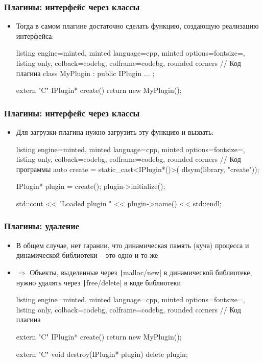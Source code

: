 \documentclass[10pt]{beamer}
\begin{document}
\begin{frame}[fragile]
\frametitle{Плагины: интерфейс через классы}
\begin{itemize}
\item Тогда в самом плагине достаточно сделать функцию, создающую реализацию интерфейса:
\begin{tcblisting}{listing engine=minted, minted language=cpp, minted options={fontsize=\scriptsize}, listing only, colback=codebg, colframe=codebg, rounded corners}
// Код плагина
class MyPlugin : public IPlugin { ... };

extern "C" IPlugin* create() {
  return new MyPlugin();
}
\end{tcblisting}
\end{itemize}
\end{frame}

\begin{frame}[fragile]
\frametitle{Плагины: интерфейс через классы}
\begin{itemize}
\item Для загрузки плагина нужно загрузить эту функцию и вызвать:
\begin{tcblisting}{listing engine=minted, minted language=cpp, minted options={fontsize=\scriptsize}, listing only, colback=codebg, colframe=codebg, rounded corners}
// Код программы
auto create = static_cast<IPlugin*()>(
  dlsym(library, "create"));

IPlugin* plugin = create();
plugin->initialize();

std::cout << "Loaded plugin "
  << plugin->name() << std::endl;
\end{tcblisting}
\end{itemize}
\end{frame}

\begin{frame}[fragile]
\frametitle{Плагины: удаление}
\begin{itemize}
\item В общем случае, нет гарании, что динамическая память (куча) процесса и динамической библиотеки -- это одно и то же
\pause
\item \(\Longrightarrow\) Объекты, выделенные через \texttt|malloc/new| в динамической библиотеке, нужно удалять через \texttt|free/delete| в коде библиотеки
\begin{tcblisting}{listing engine=minted, minted language=cpp, minted options={fontsize=\scriptsize}, listing only, colback=codebg, colframe=codebg, rounded corners}
// Код плагина

extern "C" IPlugin* create() {
  return new MyPlugin();
}

extern "C" void destroy(IPlugin* plugin) {
  delete plugin;
}
\end{tcblisting}
\end{itemize}
\end{frame}
\end{document}
